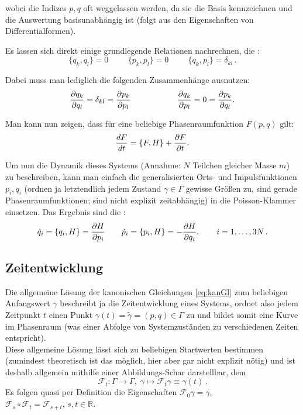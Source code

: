 \documentclass[../class_mech_main.tex]{subfiles}
\begin{document}
wobei die Indizes $p,q$ oft weggelassen werden, da sie die Basis kennzeichnen und die Auswertung basisunabhängig ist (folgt aus den Eigenschaften von Differentialformen).

Es lassen sich direkt einige grundlegende Relationen nachrechnen, die :
\begin{equation}
\{q_k, q_l\} = 0 \hspace{1cm} \{p_k, p_l\} = 0 \hspace{1cm} \{q_k, p_l\} = \delta_{kl} \, .
\end{equation}

Dabei muss man lediglich die folgenden Zusammenhänge ausnutzen:
\begin{equation}
\pdv{q_k}{q_l} = \delta_{kl} = \pdv{p_k}{p_l} \hspace{2cm} \pdv{q_k}{p_l} = 0 = \pdv{p_k}{q_l} .
\end{equation}

Man kann nun zeigen, dass für eine beliebige Phasenraumfunktion $F(p,q)$ gilt:
\begin{equation}
\dv{F}{t} = \qty{F,H} + \pdv{F}{t} .
\end{equation}

Um nun die Dynamik dieses Systems (Annahme: $N$ Teilchen gleicher Masse $m$) zu beschreiben, kann man einfach die generalisierten Orts- und Impulsfunktionen $p_i, q_i$ (ordnen ja letztendlich jedem Zustand $\gamma \in \Gamma$ gewisse Größen zu, sind gerade Phasenraumfunktionen; sind nicht explizit zeitabhängig) in die Poisson-Klammer einsetzen. Das Ergebnis sind die :
\begin{equation}\label{eq:kanGl}
\dot{q}_i = \qty{q_i, H} = \pdv{H}{p_i} \qquad \dot{p}_i = \qty{p_i, H} = -\pdv{H}{q_i}, \qquad i = 1, \dots, 3N \, .
\end{equation}



	\subsection{Zeitentwicklung}
Die allgemeine Lösung der kanonischen Gleichungen \eqref{eq:kanGl} zum beliebigen Anfangswert $\gamma$ beschreibt ja die Zeitentwicklung eines Systems, ordnet also jedem Zeitpunkt $t$ einen Punkt $\gamma(t) = \tilde{\gamma} = (p,q) \in \Gamma$ zu und bildet somit eine Kurve im Phasenraum (was einer Abfolge von Systemzuständen zu verschiedenen Zeiten entspricht).\\
Diese allgemeine Lösung lässt sich zu beliebigen Startwerten bestimmen (zumindest theoretisch ist das möglich, hier aber gar nicht explizit nötig) und ist deshalb allgemein mithilfe einer Abbildungs-Schar darstellbar, dem 
\begin{equation}
\mathcal{F}_t : \Gamma \rightarrow \Gamma, \; \gamma \mapsto \mathcal{F}_t \gamma \equiv \gamma(t) \, .
\end{equation}
Es folgen quasi per Definition die Eigenschaften $\mathcal{F}_0 \gamma = \gamma$, $\mathcal{F}_s \circ \mathcal{F}_t = \mathcal{F}_{s+t}, \, s,t \in \mathbb{R}$.
\end{document}
